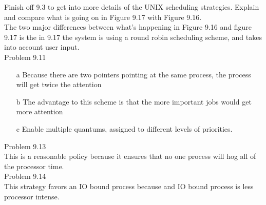 \documentclass[12pt]{amsart}
\begin{document}
Finish off 9.3 to get into more details of the UNIX scheduling strategies. Explain and compare what is going on in Figure 9.17 with Figure 9.16. \\
The two major differences between what's happening in Figure 9.16 and figure 9.17 is the in 9.17 the system is using a round robin scheduling scheme, and takes into account user input. \\

Problem 9.11 \\ 
\begin{enumerate}
	\item[a] Because there are two pointers pointing at the same process, the process will get twice the attention
	\item[b] The advantage to this scheme is that the more important jobs would get more attention
	\item[c] Enable multiple quantums, assigned to different levels of priorities. \\
	
\end{enumerate}
Problem 9.13 \\
This is a reasonable policy because it ensures that no one process will hog all of the processor time.\\

Problem 9.14 \\
This strategy favors an I\/O bound process because and I\/O bound process is less processor intense.
\end{document}
